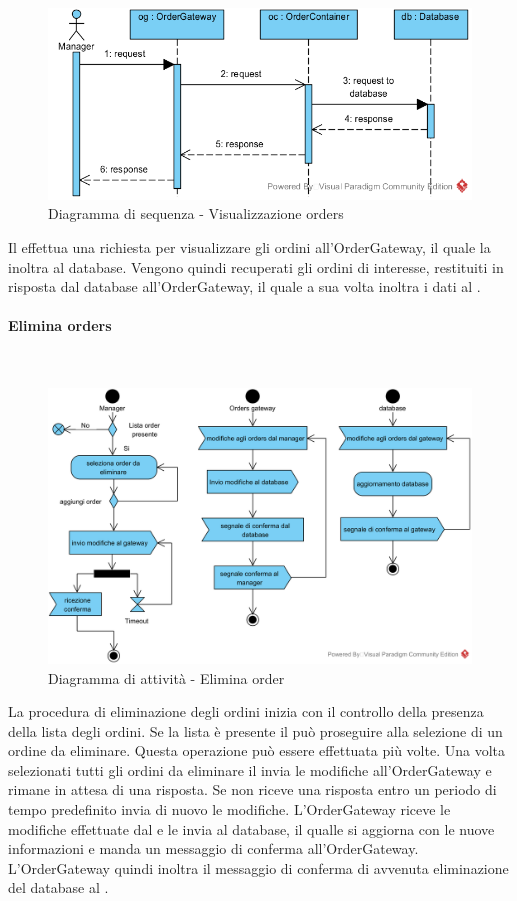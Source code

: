 \begin{figure}[H]
	\centering
	\includegraphics[width=14cm]{../../documenti/SpecificaTecnica/diagrammi_img/sequenza/direttore_visualizza_orders.png}
	\caption{Diagramma di sequenza - Visualizzazione orders}
\end{figure}
Il \Manager{} effettua una richiesta per visualizzare gli ordini all'Order\-Gateway, il quale la inoltra al database. Vengono quindi recuperati gli ordini di interesse, restituiti in risposta dal database all'Order\-Gateway, il quale a sua volta inoltra i dati al \Manager{}.

\paragraph{Elimina orders}\mbox{}\\
\nopagebreak
\begin{figure}[H]
	\centering
	\includegraphics[width=14cm]{diagrammi_img/attivita/manager_order_remove.png}
	\caption{Diagramma di attività - Elimina order}
\end{figure}
La procedura di eliminazione degli ordini inizia con il controllo della presenza della lista degli ordini. Se la lista è presente il \Manager{} può proseguire alla selezione di un ordine da eliminare. Questa operazione può essere effettuata più volte. Una volta selezionati tutti gli ordini da eliminare il \Manager{} invia le modifiche all'OrderGateway e rimane in attesa di una risposta. Se non riceve una risposta entro un periodo di tempo predefinito invia di nuovo le modifiche. L'OrderGateway riceve le modifiche effettuate dal \Manager{} e le invia al database, il qualle si aggiorna con le nuove informazioni e manda un messaggio di conferma all'OrderGateway. L'OrderGateway quindi inoltra il messaggio di conferma di avvenuta eliminazione del database al \Manager{}.

